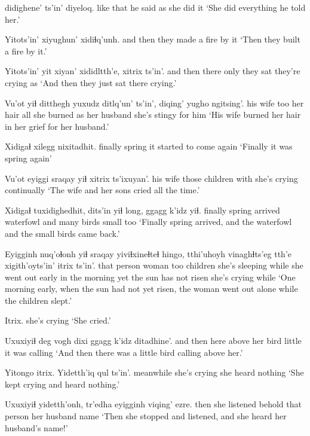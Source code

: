 \documentclass[12pt]{article}
\begin{document}
 didighene' ts'in' diyeloq.
{like that} {he said } as {she did it}
\glt `She did everything he told her.'
\glend 

\gll Yitots'in' {xiyughun' xidiɬq'unh.}
{and then} {they made a fire by it}
\glt `Then they built a fire by it.'
\glend 

\gll Yitots'in' yit xiyan' xididltth'e, xitrix ts'in'.
{and then} there only  {they sat} {they're crying} as
\glt `And then they just sat there crying.'
\glend 

\gll Vu'ot  yiɬ ditthegh yuxudz ditlq'un' ts'in',  diqing' {yugho ngitsing'.}
{his wife} too {her hair} all {she burned} as  {her husband} {she's stingy for him}
\glt `His wife burned her hair in her grief for her husband.'
\glend 

\gll Xidigaɬ xilegg nixitadhit.
finally  spring  {it started to come again}
\glt `Finally it was spring again'
\glend 

\gll Vu'ot  eyiggi  sraqay  yiɬ xitrix ts'ixuyan'.
{his wife} those  children  with {she's crying} continually
\glt `The wife and her sons cried all the time.'
\glend 

\gll Xidigaɬ tuxidighedhit, dits'in yiɬ long, ggagg  k'idz yiɬ.
finally  {spring arrived} waterfowl and many birds  small too
\glt `Finally spring arrived, and the waterfowl and the small birds came back.'
\glend 

\gll Eyigginh nuq'oɬonh yiɬ sraqay  yiviɬxineɬteɬ hingo, tthi'uhoyh vinaghɬts'eg tth'e {xigith'oyts'in'} itrix ts'in'.
{that person} woman  too children {she's sleeping} while {she went out} {early in the morning} yet {the sun has not risen} {she's crying} while
\glt `One morning early, when the sun had not yet risen, the woman went out alone while the children slept.'
\glend 

\gll Itrix.
{{she's crying}}
\glt `She cried.'
\glend 

\gll Uxuxiyiɬ deg {vogh dixi} ggagg  k'idz ditadhine'.
{and then} here {above her} bird little {it was calling}
\glt `And then there was a little bird calling above her.'
\glend 

\gll Yitongo itrix.   {Yidetth'iq qul ts'in'.}
meanwhile {she's crying} {she heard nothing}
\glt `She kept crying and heard nothing.'
\glend 

\gll Uxuxiyiɬ yidetth'onh, tr'edha eyigginh viqing' ezre.
then  {she listened} behold {that person} {her husband} name
\glt `Then she stopped and listened, and she heard her husband's name!'
\glend 
\end{document}
